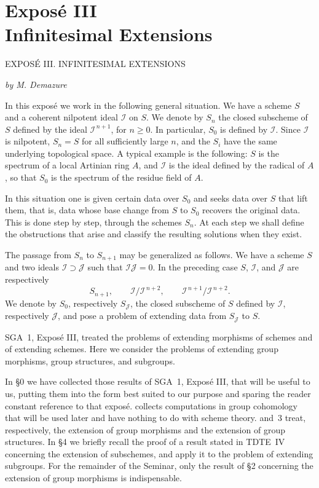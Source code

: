 
\chapter*{Expos\'e III\\Infinitesimal Extensions}
%
  {EXPOS\'E III. INFINITESIMAL EXTENSIONS}

\begin{center}
  \textit{by M. Demazure}
\end{center}

In this expos\'e we work in the following general situation. We have a
scheme \(S\) and a coherent nilpotent ideal \(\mathscr I\) on \(S\).
We denote by \(S_n\) the closed subscheme of \(S\) defined by the ideal
\(\mathscr I^{\,n+1}\), for \(n\geq 0\). In particular, \(S_0\) is
defined by \(\mathscr I\). Since \(\mathscr I\) is nilpotent, \(S_n=S\)
for all sufficiently large \(n\), and the \(S_i\) have the same
underlying topological space. A typical example is the following:
\(S\) is the spectrum of a local Artinian ring \(A\), and \(\mathscr I\)
is the ideal defined by the radical of \(A\), so that \(S_0\) is the
spectrum of the residue field of \(A\).

In this situation one is given certain data over \(S_0\) and seeks data
over \(S\) that lift them, that is, data whose base change from \(S\) to
\(S_0\) recovers the original data. This is done step by step, through
the schemes \(S_n\). At each step we shall define the obstructions that
arise and classify the resulting solutions when they exist.

The passage from \(S_n\) to \(S_{n+1}\) may be generalized as follows.
We have a scheme \(S\) and two ideals \(\mathscr I\supset\mathscr J\)
such that \(\mathscr I\mathscr J=0\). In the preceding case \(S\),
\(\mathscr I\), and \(\mathscr J\) are respectively
\[
 S_{n+1},\qquad
 \mathscr I/\mathscr I^{\,n+2},\qquad
 \mathscr I^{\,n+1}/\mathscr I^{\,n+2}.
\]
We denote by \(S_0\), respectively \(S_{\mathscr J}\), the closed
subscheme of \(S\) defined by \(\mathscr I\), respectively
\(\mathscr J\), and pose a problem of extending data from
\(S_{\mathscr J}\) to \(S\).

SGA~1, Expos\'e III, treated the problems of extending morphisms of
schemes and of extending schemes. Here we consider the problems of
extending group morphisms, group structures, and subgroups.

In \S0 we have collected those results of SGA~1, Expos\'e III, that
will be useful to us, putting them into the form best suited to our
purpose and sparing the reader constant reference to that
expos\'e.  collects computations in group cohomology
that will be used later and have nothing to do with scheme theory.
 and~3 treat, respectively, the extension of group morphisms
and the extension of group structures. In \S4 we briefly recall the
proof of a result stated in TDTE~IV concerning the extension of
subschemes, and apply it to the problem of extending subgroups. For the
remainder of the Seminar, only the result of \S2 concerning the
extension of group morphisms is indispensable.

